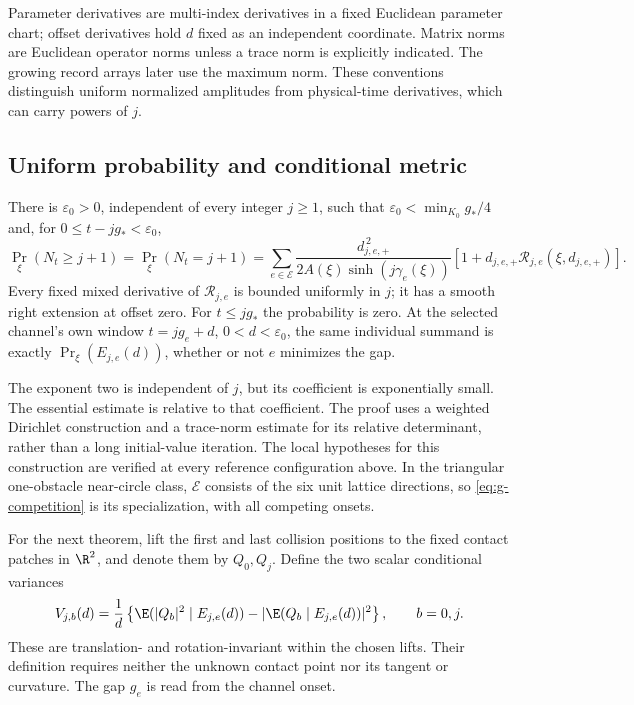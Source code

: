 Parameter derivatives are multi-index derivatives in a fixed Euclidean
parameter chart; offset derivatives hold $d$ fixed as an independent
coordinate. Matrix norms are Euclidean operator norms unless a trace
norm is explicitly indicated. The growing record arrays later use the
maximum norm. These conventions distinguish uniform normalized
amplitudes from physical-time derivatives, which can carry powers of $j$.

\subsection{Uniform probability and conditional metric}
\begin{theorem}
\label{thm:g-stability}
There is $\varepsilon_0>0$, independent of every integer $j\ge1$, such
that $\varepsilon_0<\min_{K_0}g_*/4$ and, for
$0\le t-jg_*<\varepsilon_0$,
\begin{equation}\label{eq:g-competition}
 \Pr_\xi(N_t\ge j+1)=\Pr_\xi(N_t=j+1)
 =\sum_{e\in\mathcal E}
 \frac{d_{j,e,+}^{\,2}}{2A(\xi)\sinh(j\gamma_e(\xi))}
       [1+d_{j,e,+}\mathcal R_{j,e}(\xi,d_{j,e,+})].
\end{equation}
Every fixed mixed derivative of $\mathcal R_{j,e}$ is bounded uniformly
in $j$; it has a smooth right extension at offset zero. For $t\le jg_*$
the probability is zero. At the selected channel's own window
$t=jg_e+d$, $0<d<\varepsilon_0$, the same individual summand is exactly
$\Pr_\xi(E_{j,e}(d))$, whether or not $e$ minimizes the gap.
\end{theorem}

The exponent two is independent of $j$, but its coefficient is
exponentially small. The essential estimate is relative to that
coefficient. The proof uses a weighted Dirichlet construction and a
trace-norm estimate for its relative determinant, rather than a
long initial-value iteration. The local hypotheses for this construction
are verified at every reference configuration above. In the triangular
one-obstacle near-circle class, $\mathcal E$ consists of the six unit
lattice directions, so \eqref{eq:g-competition} is its specialization, with all competing onsets.

For the next theorem, lift the first and last collision positions to
the fixed contact patches in $\R^2$, and denote them by $Q_0,Q_j$.
Define the two scalar conditional variances
\begin{equation}\label{eq:v3-observed-variance}
 V_{j,b}(d)=\frac1d\left\{
 \E(|Q_b|^2\mid E_{j,e}(d))-
       |\E(Q_b\mid E_{j,e}(d))|^2\right\},\qquad b=0,j.
\end{equation}
These are translation- and rotation-invariant within the chosen lifts.
Their definition requires neither the unknown contact point nor its
tangent or curvature. The gap $g_e$ is read from the channel onset.

